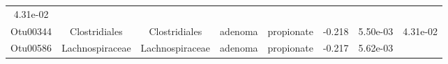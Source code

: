\documentclass[11pt,]{article}
\begin{document}
\begin{longtable}[]{@{}cccccccc@{}}
\begin{minipage}[t]{0.08\columnwidth}
4.31e-02\strut
\end{minipage}\tabularnewline
\begin{minipage}[t]{0.08\columnwidth}\centering\strut
Otu00344\strut
\end{minipage} & \begin{minipage}[t]{0.15\columnwidth}\centering\strut
Clostridiales\strut
\end{minipage} & \begin{minipage}[t]{0.15\columnwidth}\centering\strut
Clostridiales\strut
\end{minipage} & \begin{minipage}[t]{0.08\columnwidth}\centering\strut
adenoma\strut
\end{minipage} & \begin{minipage}[t]{0.09\columnwidth}\centering\strut
propionate\strut
\end{minipage} & \begin{minipage}[t]{0.07\columnwidth}\centering\strut
-0.218\strut
\end{minipage} & \begin{minipage}[t]{0.08\columnwidth}\centering\strut
5.50e-03\strut
\end{minipage} & \begin{minipage}[t]{0.08\columnwidth}\centering\strut
4.31e-02\strut
\end{minipage}\tabularnewline
\begin{minipage}[t]{0.08\columnwidth}\centering\strut
Otu00586\strut
\end{minipage} & \begin{minipage}[t]{0.15\columnwidth}\centering\strut
Lachnospiraceae\strut
\end{minipage} & \begin{minipage}[t]{0.15\columnwidth}\centering\strut
Lachnospiraceae\strut
\end{minipage} & \begin{minipage}[t]{0.08\columnwidth}\centering\strut
adenoma\strut
\end{minipage} & \begin{minipage}[t]{0.09\columnwidth}\centering\strut
propionate\strut
\end{minipage} & \begin{minipage}[t]{0.07\columnwidth}\centering\strut
-0.217\strut
\end{minipage} & \begin{minipage}[t]{0.08\columnwidth}\centering\strut
5.62e-03\strut
\end{minipage} & \begin{minipage}[t]{0.08\columnwidth}\centering\strut

\end{minipage}
\end{longtable}
\end{document}
